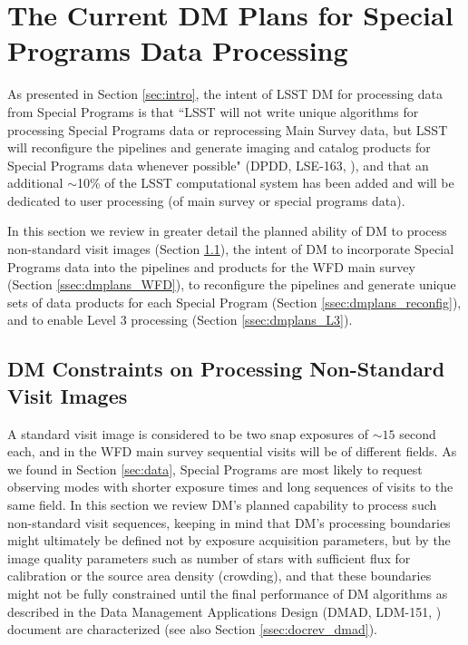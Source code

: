 \documentclass[DM,lsstdraft,toc]{lsstdoc}
\begin{document}
\clearpage
\section{The Current DM Plans for Special Programs Data Processing} \label{sec:dmplans}

As presented in Section \ref{sec:intro}, the intent of LSST DM for processing data from Special Programs is that ``LSST will not write unique algorithms for processing Special Programs data or reprocessing Main Survey data, but LSST will reconfigure the pipelines and generate imaging and catalog products for Special Programs data whenever possible" (DPDD, LSE-163, \cite{LSE-163}), and that an additional $\sim$10\% of the LSST computational system has been added and will be dedicated to user processing (of main survey or special programs data).

In this section we review in greater detail the planned ability of DM to process non-standard visit images (Section \ref{ssec:dmplans_NSV}), the intent of DM to incorporate Special Programs data into the pipelines and products for the WFD main survey (Section \ref{ssec:dmplans_WFD}), to reconfigure the pipelines and generate unique sets of data products for each Special Program (Section \ref{ssec:dmplans_reconfig}), and to enable Level 3 processing (Section \ref{ssec:dmplans_L3}).

\subsection{DM Constraints on Processing Non-Standard Visit Images}\label{ssec:dmplans_NSV}

A standard visit image is considered to be two snap exposures of $\sim15$ second each, and in the WFD main survey sequential visits will be of different fields. As we found in Section \ref{sec:data}, Special Programs are most likely to request observing modes with shorter exposure times and long sequences of visits to the same field. In this section we review DM's planned capability to process such non-standard visit sequences, keeping in mind that DM's processing boundaries might ultimately be defined not by exposure acquisition parameters, but by the image quality parameters such as number of stars with sufficient flux for calibration or the source area density (crowding), and that these boundaries might not be fully constrained until the final performance of DM algorithms as described in the Data Management Applications Design (DMAD, LDM-151, \cite{LDM-151}) document are characterized (see also Section \ref{ssec:docrev_dmad}).
\end{document}

